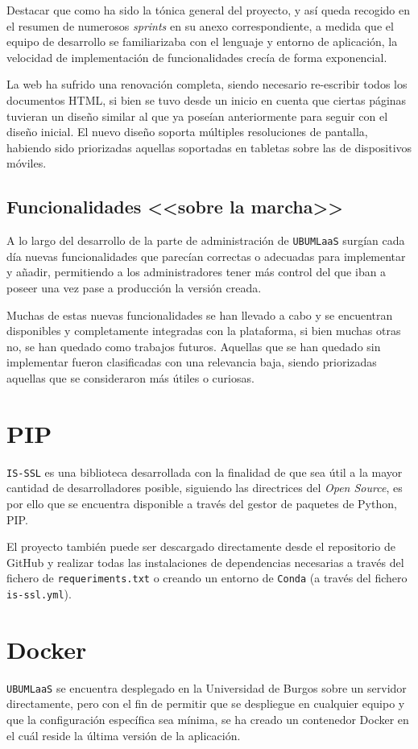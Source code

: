 Destacar que como ha sido la tónica general del proyecto, y así queda recogido en el resumen de numerosos \textit{sprints} en su anexo correspondiente, a medida que el equipo de desarrollo se familiarizaba con el lenguaje y entorno de aplicación, la velocidad de implementación de funcionalidades crecía de forma exponencial.

La web ha sufrido una renovación completa, siendo necesario re-escribir todos los documentos HTML, si bien se tuvo desde un inicio en cuenta que ciertas páginas tuvieran un diseño similar al que ya poseían anteriormente para seguir con el diseño inicial. El nuevo diseño soporta múltiples resoluciones de pantalla, habiendo sido priorizadas aquellas soportadas en tabletas sobre las de dispositivos móviles.

\subsection{Funcionalidades <<sobre la marcha>>}
A lo largo del desarrollo de la parte de administración de \texttt{UBUMLaaS} surgían cada día nuevas funcionalidades que parecían correctas o adecuadas para implementar y añadir, permitiendo a los administradores tener más control del que iban a poseer una vez pase a producción la versión creada.

Muchas de estas nuevas funcionalidades se han llevado a cabo y se encuentran disponibles y completamente integradas con la plataforma, si bien muchas otras no, se han quedado como trabajos futuros. Aquellas que se han quedado sin implementar fueron clasificadas con una relevancia baja, siendo priorizadas aquellas que se consideraron más útiles o curiosas.

\section{PIP}
\texttt{IS-SSL} es una biblioteca desarrollada con la finalidad de que sea útil a la mayor cantidad de desarrolladores posible, siguiendo las directrices del \textit{Open Source}, es por ello que se encuentra disponible a través del gestor de paquetes de Python, PIP. 

El proyecto también puede ser descargado directamente desde el repositorio de GitHub y realizar todas las instalaciones de dependencias necesarias a través del fichero de \texttt{requeriments.txt} o creando un entorno de \texttt{Conda} (a través del fichero \texttt{is-ssl.yml}).

\section{Docker}
\texttt{UBUMLaaS} se encuentra desplegado en la Universidad de Burgos sobre un servidor directamente, pero con el fin de permitir que se despliegue en cualquier equipo y que la configuración específica sea mínima, se ha creado un contenedor Docker en el cuál reside la última versión de la aplicación. 

